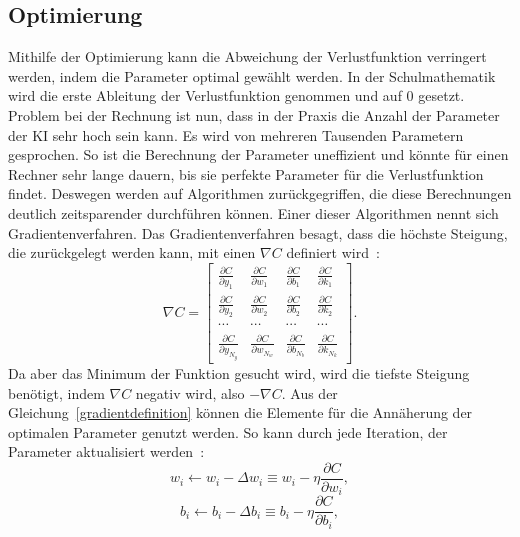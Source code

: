 \documentclass[11pt]{article}
\begin{document}
\subsection{Optimierung}\label{gradient}
Mithilfe der Optimierung kann die Abweichung der Verlustfunktion verringert werden, indem die Parameter optimal gewählt werden. In der Schulmathematik %
wird die erste Ableitung der Verlustfunktion genommen und auf $0$ gesetzt. Problem bei der Rechnung ist nun, dass in der Praxis die Anzahl der Parameter
der KI sehr hoch sein kann. Es wird von mehreren Tausenden Parametern gesprochen. So ist die Berechnung der Parameter uneffizient und könnte für einen
Rechner sehr lange dauern, bis sie perfekte Parameter für die Verlustfunktion findet. Deswegen werden auf Algorithmen zurückgegriffen, die diese
Berechnungen deutlich zeitsparender durchführen können. Einer dieser Algorithmen nennt sich Gradientenverfahren. Das Gradientenverfahren besagt, dass die höchste
Steigung, die zurückgelegt werden kann, mit einen $\nabla C$ definiert wird~\cite{5}:
\begin{equation}\label{gradientdefinition}
    \nabla C =
    \begin{bmatrix}
        \frac{\partial C}{\partial y_{1}} & \frac{\partial C}{\partial w_{1}} & \frac{\partial C}{\partial b_{1}} & \frac{\partial C}{\partial k_{1}}
        \\ \frac{\partial C}{\partial y_{2}} & \frac{\partial C}{\partial w_{2}} & \frac{\partial C}{\partial b_{2}} & \frac{\partial C}{\partial k_{2}}
        \\ \cdots & \cdots & \cdots & \cdots
        \\ \frac{\partial C}{\partial y_{N_y}} & \frac{\partial C}{\partial w_{N_w}} & \frac{\partial C}{\partial b_{N_b}} & \frac{\partial C}{\partial k_{N_k}}
    \end{bmatrix}.
\end{equation}
Da aber das Minimum der Funktion gesucht wird, wird die tiefste Steigung
benötigt, indem $\nabla C$ negativ wird, also $-\nabla C$. Aus der Gleichung~\ref{gradientdefinition} können die Elemente für die Annäherung der optimalen Parameter genutzt werden.
So kann durch jede Iteration, der Parameter aktualisiert werden~\cite{8}:
\begin{equation}
    w_i \leftarrow w_i - \Delta w_i \equiv  w_i - \eta \frac{\partial C}{\partial w_{i}},
\end{equation}
\begin{equation}
    b_i \leftarrow b_i - \Delta b_i \equiv  b_i - \eta \frac{\partial C}{\partial b_{i}},
\end{equation}
\end{document}

